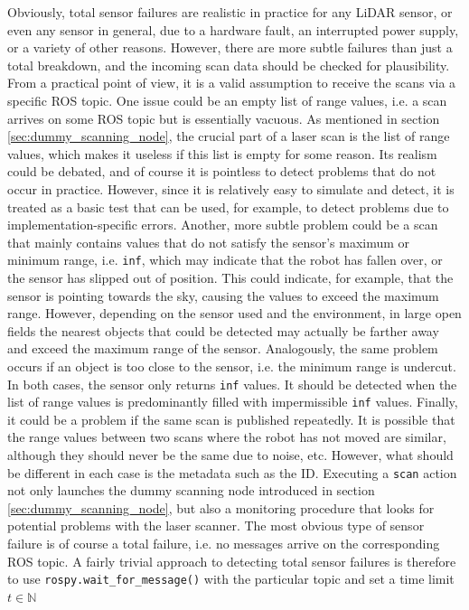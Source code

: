 \documentclass[english, master, utf8]{base/thesis_KBS}
\newcommand{\code}[1]{\colorbox{light-gray}{\texttt{#1}}}
\begin{document}
Obviously, total sensor failures are realistic in practice for any LiDAR sensor, or even any sensor in general, due to a hardware fault, an interrupted
power supply, or a variety of other reasons. However, there are more subtle failures than just a total breakdown, and the incoming scan data should be checked for plausibility.
From a practical point of view, it is a valid assumption to receive the scans via a specific ROS topic. One issue could be an empty list of range values, i.e. a scan arrives on
some ROS topic but is essentially vacuous. As mentioned in section \ref{sec:dummy_scanning_node}, the crucial part of a laser scan is the list of range values, which makes it 
useless if this list is empty for some reason. Its realism could be debated, and of course it is pointless to detect problems that do not occur in practice. However, since it is
relatively easy to simulate and detect, it is treated as a basic test that can be used, for example, to detect problems due to implementation-specific errors.
Another, more subtle problem could be a scan that mainly contains values that do not satisfy the sensor's maximum or minimum range, i.e. \code{inf}, which may indicate that
the robot has fallen over, or the sensor has slipped out of position. This could indicate, for example, that the sensor is pointing towards the sky, causing the values to exceed
the maximum range. However, depending on the sensor used and the environment, in large open fields the nearest objects that could be detected may actually be farther away and exceed
the maximum range of the sensor. Analogously, the same problem occurs if an object is too close to the sensor, i.e. the minimum range is undercut. In both cases, the sensor only
returns \code{inf} values. It should be detected when the list of range values is predominantly filled with impermissible \code{inf} values. Finally, it could be a problem if the
same scan is published repeatedly. It is possible that the range values between two scans where the robot has not moved are similar, although they should never be the same due to
noise, etc. However, what should be different in each case is the metadata such as the ID.\newline
Executing a \code{scan} action not only launches the dummy scanning node introduced in section \ref{sec:dummy_scanning_node}, but also a monitoring procedure that
looks for potential problems with the laser scanner. The most obvious type of sensor failure is of course a total failure, i.e. no messages arrive on the corresponding ROS topic.
A fairly trivial approach to detecting total sensor failures is therefore to use \code{rospy.wait\_for\_message()} with the particular topic and set a time limit $t \in \mathbb{N}$
\end{document}
